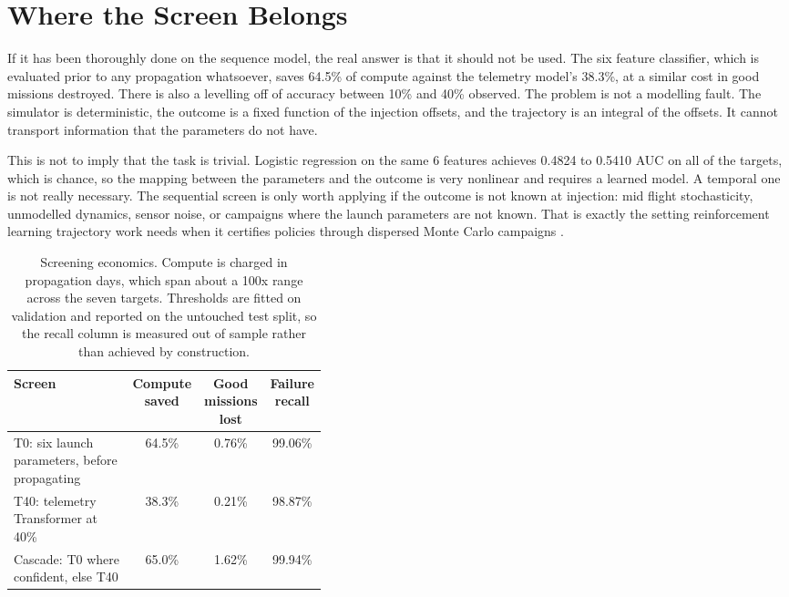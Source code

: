 \documentclass[preprint,12pt,authoryear,doubleblind]{elsarticle}
\begin{document}
\section{Where the Screen Belongs}
\label{sec:screen}

If it has been thoroughly done on the sequence model, the real answer is that it should not be used. The six feature classifier, which is evaluated prior to any propagation whatsoever, saves 64.5\% of compute against the telemetry model's 38.3\%, at a similar cost in good missions destroyed. There is also a levelling off of accuracy between 10\% and 40\% observed. The problem is not a modelling fault. The simulator is deterministic, the outcome is a fixed function of the injection offsets, and the trajectory is an integral of the offsets. It cannot transport information that the parameters do not have.

This is not to imply that the task is trivial. Logistic regression on the same 6 features achieves 0.4824 to 0.5410 AUC on all of the targets, which is chance, so the mapping between the parameters and the outcome is very nonlinear and requires a learned model. A temporal one is not really necessary. The sequential screen is only worth applying if the outcome is not known at injection: mid flight stochasticity, unmodelled dynamics, sensor noise, or campaigns where the launch parameters are not known. That is exactly the setting reinforcement learning trajectory work needs when it certifies policies through dispersed Monte Carlo campaigns \citep{zavoli2021}.

\begin{table}[t]
\centering
\caption{Screening economics. Compute is charged in propagation days, which span about a 100x range across the seven targets. Thresholds are fitted on validation and reported on the untouched test split, so the recall column is measured out of sample rather than achieved by construction.}
\label{tab:economics}
\footnotesize
\setlength{\tabcolsep}{4pt}
\begin{tabular}{@{}p{0.40\linewidth}ccc@{}}
\toprule
Screen & Compute saved & Good missions lost & Failure recall \\
\midrule
T0: six launch parameters, before propagating & 64.5\% & 0.76\% & 99.06\% \\
T40: telemetry Transformer at 40\% & 38.3\% & 0.21\% & 98.87\% \\
Cascade: T0 where confident, else T40 & 65.0\% & 1.62\% & 99.94\% \\
\bottomrule
\end{tabular}
\end{table}
\end{document}
